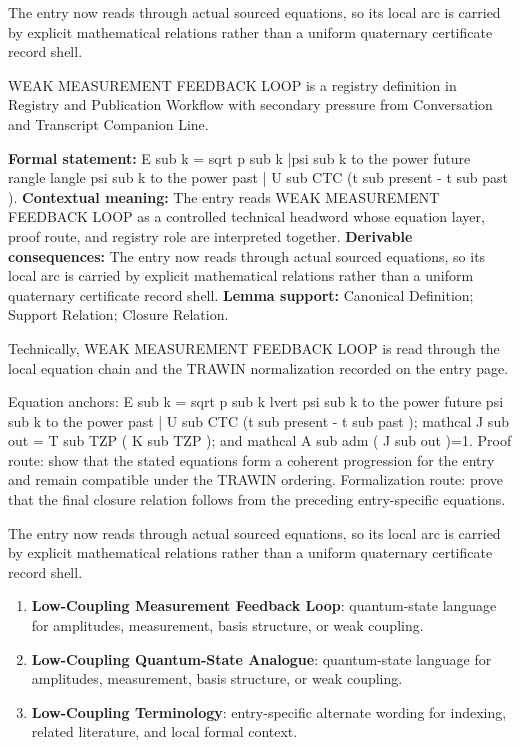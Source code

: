 The entry now reads through actual sourced equations, so its local arc is carried by explicit mathematical relations rather than a uniform quaternary certificate record shell.
\clearpage


\begingroup\small
{}
WEAK MEASUREMENT FEEDBACK LOOP is a registry definition in Registry and Publication Workflow with secondary pressure from Conversation and Transcript Companion Line.

\begingroup\footnotesize\setlength{\emergencystretch}{3em}\sloppy
\textbf{Formal statement:} E sub k = sqrt p sub k |psi sub k to the power future rangle langle psi sub k to the power past | U sub CTC (t sub present - t sub past ). \textbf{Contextual meaning:} The entry reads WEAK MEASUREMENT FEEDBACK LOOP as a controlled technical headword whose equation layer, proof route, and registry role are interpreted together. \textbf{Derivable consequences:} The entry now reads through actual sourced equations, so its local arc is carried by explicit mathematical relations rather than a uniform quaternary certificate record shell. \textbf{Lemma support:} Canonical Definition; Support Relation; Closure Relation.\par
\endgroup

Technically, WEAK MEASUREMENT FEEDBACK LOOP is read through the local equation chain and the TRAWIN normalization recorded on the entry page.

Equation anchors: E sub k = sqrt p sub k lvert psi sub k to the power future psi sub k to the power past | U sub CTC (t sub present - t sub past ); mathcal J sub out = T sub TZP ( K sub TZP ); and mathcal A sub adm ( J sub out )=1. Proof route: show that the stated equations form a coherent progression for the entry and remain compatible under the TRAWIN ordering. Formalization route: prove that the final closure relation follows from the preceding entry-specific equations.

The entry now reads through actual sourced equations, so its local arc is carried by explicit mathematical relations rather than a uniform quaternary certificate record shell.
\endgroup

\begin{enumerate}[leftmargin=1.6em,itemsep=6pt,topsep=4pt]
\item \textbf{Low-Coupling Measurement Feedback Loop}: quantum-state language for amplitudes, measurement, basis structure, or weak coupling.
\item \textbf{Low-Coupling Quantum-State Analogue}: quantum-state language for amplitudes, measurement, basis structure, or weak coupling.
\item \textbf{Low-Coupling Terminology}: entry-specific alternate wording for indexing, related literature, and local formal context.
\end{enumerate}

